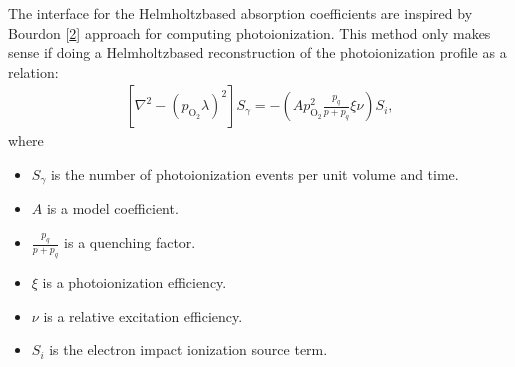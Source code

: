 \documentclass[letterpaper,10pt,english]{sphinxmanual}
\begin{document}
The interface for the Helmholtz\sphinxhyphen{}based absorption coefficients are inspired by Bourdon  {[}\hyperlink{cite.ZZReferences:id12}{2}{]} approach for computing photoionization.
This method only makes sense if doing a Helmholtz\sphinxhyphen{}based reconstruction of the photoionization profile as a relation:
\begin{equation*}
\begin{split}\left[\nabla^2 - \left(p_{\textrm{O}_2} \lambda\right)^2\right]S_\gamma = -\left(A p_{\textrm{O}_2}^2\frac{p_q}{p + p_q}\xi\nu\right)S_i,\end{split}
\end{equation*}
where
\begin{itemize}
\item {} 
\(S_\gamma\) is the number of photoionization events per unit volume and time.

\item {} 
\(A\) is a model coefficient.

\item {} 
\(\frac{p_q}{p + p_q}\) is a quenching factor.

\item {} 
\(\xi\) is a photoionization efficiency.

\item {} 
\(\nu\) is a relative excitation efficiency.

\item {} 
\(S_i\) is the electron impact ionization source term.

\end{itemize}
\end{document}

